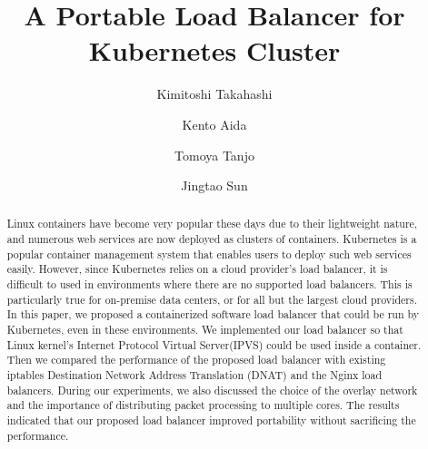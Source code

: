 \documentclass[sigconf]{acmart}
\begin{document}
\title{A Portable Load Balancer for Kubernetes Cluster}

\author{Kimitoshi Takahashi}

\author{Kento Aida}

\author{Tomoya Tanjo}

\author{Jingtao Sun}

\renewcommand{\shortauthors}{K. Takahashi et al.}


\begin{abstract}
Linux containers have become very popular these days due to their lightweight nature, and numerous
web services are now deployed as clusters of containers. 
Kubernetes is a popular container management system that enables users to deploy such web services easily.
However, since Kubernetes relies on a cloud provider's load balancer, 
it is difficult to used in environments where there are no supported load balancers.
This is particularly true for on-premise data centers, or for all but the largest cloud providers.
In this paper, we proposed a containerized software load balancer that could be run by Kubernetes, even in these environments.
We implemented our load balancer so that Linux kernel's Internet Protocol Virtual Server(IPVS) could be used inside a container.
Then we compared the performance of the proposed load balancer with existing iptables Destination Network Address 
Translation (DNAT) and the Nginx load balancers.
During our experiments, we also discussed the choice of the overlay network and 
the importance of distributing packet processing to multiple cores.
The results indicated that our proposed load balancer improved portability without sacrificing the performance.
\end{abstract}
\end{document}
